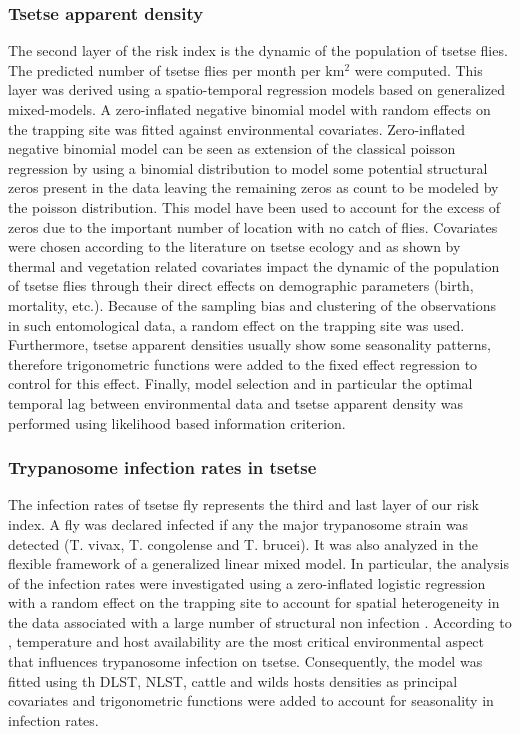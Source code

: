\documentclass[10pt]{article}
\begin{document}
\subsubsection*{Tsetse apparent density}
\label{unnumbered-10}
The second layer of the risk index is the dynamic of the population of tsetse flies. 
The predicted number of tsetse flies per month per km\(^{\text{2}}\) were computed. 
This layer was derived using a spatio-temporal regression models based on generalized mixed-models.
A zero-inflated negative binomial model with random effects on the trapping site was fitted against environmental covariates.
Zero-inflated negative binomial model can be seen as extension of the classical poisson regression by using a binomial distribution
to model some potential structural zeros present in the data leaving the remaining zeros as count to be modeled by the poisson distribution.
This model have been used to account for the excess of zeros due to the important number of location with no catch of flies. 
Covariates were chosen according to the literature on tsetse ecology and as shown \cite{rogers1986distribution} by thermal and vegetation related covariates impact the dynamic of the population of tsetse flies through their direct effects on
demographic parameters (birth, mortality, etc.). Because of the sampling bias and clustering of the observations in such entomological data, a random effect on the trapping site was used. 
Furthermore, tsetse apparent densities usually show some seasonality patterns, therefore trigonometric functions were added to the fixed effect regression to control for this effect. 
Finally, model selection and in particular the optimal temporal lag between environmental data and tsetse apparent density 
was performed using likelihood based information criterion.

\subsubsection*{Trypanosome infection rates in tsetse}
\label{unnumbered-11}
The infection rates of tsetse fly represents the third and last layer of our risk index. 
A fly was declared infected if any the major trypanosome strain was detected (T. vivax, T. congolense and T. brucei).
It was also analyzed in the flexible framework of a generalized linear mixed model. 
In particular, the analysis of the infection rates were investigated using a zero-inflated logistic regression with a random effect on the trapping site to account  
for spatial heterogeneity in the data associated with a large number of structural non infection \cite{amek2011spatio, kasasa2013spatio}.
According to \cite{molyneux1980host}, temperature and host availability are the most critical environmental aspect that influences trypanosome
infection on tsetse. Consequently, the model was fitted using th DLST, NLST, cattle and wilds hosts densities as principal covariates and trigonometric functions were
added to account for seasonality in infection rates. 
\end{document}
